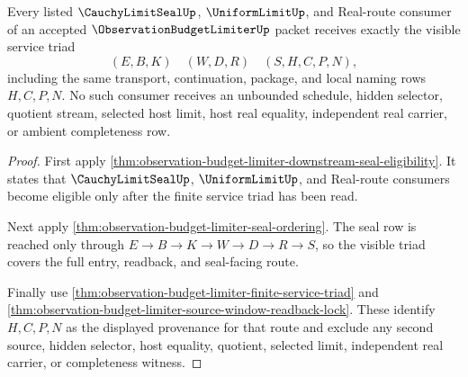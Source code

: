 \begin{theorem}
\label{thm:observation-budget-limiter-service-triad-coverage}
Every listed $\CauchyLimitSealUp$, $\UniformLimitUp$, and Real-route consumer of an accepted $\ObservationBudgetLimiterUp$ packet receives exactly the visible service triad
$$
(E,B,K) \quad (W,D,R) \quad (S,H,C,P,N),
$$
including the same transport, continuation, package, and local naming rows $H,C,P,N$. No such consumer receives an unbounded schedule, hidden selector, quotient stream, selected host limit, host real equality, independent real carrier, or ambient completeness row.
\end{theorem}
\begin{proof}
First apply \autoref{thm:observation-budget-limiter-downstream-seal-eligibility}. It states that $\CauchyLimitSealUp$, $\UniformLimitUp$, and Real-route consumers become eligible only after the finite service triad has been read.

Next apply \autoref{thm:observation-budget-limiter-seal-ordering}. The seal row is reached only through $E \to B \to K \to W \to D \to R \to S$, so the visible triad covers the full entry, readback, and seal-facing route.

Finally use \autoref{thm:observation-budget-limiter-finite-service-triad} and \autoref{thm:observation-budget-limiter-source-window-readback-lock}. These identify $H,C,P,N$ as the displayed provenance for that route and exclude any second source, hidden selector, host equality, quotient, selected limit, independent real carrier, or completeness witness.
\end{proof}

